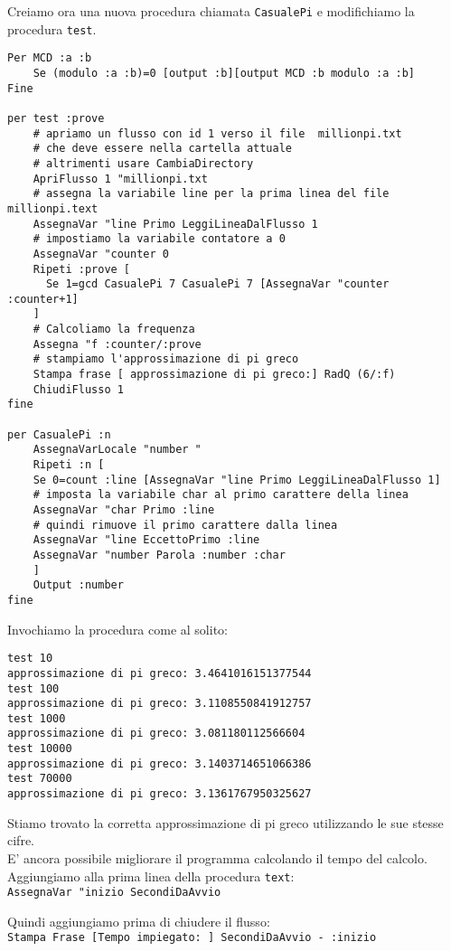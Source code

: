 Creiamo ora una nuova procedura chiamata \texttt{CasualePi} e modifichiamo la procedura \texttt{test}.
\begin{lstlisting}
Per MCD :a :b
	Se (modulo :a :b)=0 [output :b][output MCD :b modulo :a :b] 
Fine

per test :prove
	# apriamo un flusso con id 1 verso il file  millionpi.txt
	# che deve essere nella cartella attuale
	# altrimenti usare CambiaDirectory
	ApriFlusso 1 "millionpi.txt
	# assegna la variabile line per la prima linea del file millionpi.text
	AssegnaVar "line Primo LeggiLineaDalFlusso 1
	# impostiamo la variabile contatore a 0
	AssegnaVar "counter 0
	Ripeti :prove [
	  Se 1=gcd CasualePi 7 CasualePi 7 [AssegnaVar "counter :counter+1]
	]
	# Calcoliamo la frequenza
	Assegna "f :counter/:prove
	# stampiamo l'approssimazione di pi greco
	Stampa frase [ approssimazione di pi greco:] RadQ (6/:f)
	ChiudiFlusso 1
fine

per CasualePi :n
	AssegnaVarLocale "number "
	Ripeti :n [
	Se 0=count :line [AssegnaVar "line Primo LeggiLineaDalFlusso 1]
	# imposta la variabile char al primo carattere della linea
	AssegnaVar "char Primo :line
	# quindi rimuove il primo carattere dalla linea
	AssegnaVar "line EccettoPrimo :line
	AssegnaVar "number Parola :number :char
	]
	Output :number
fine
\end{lstlisting}

Invochiamo la procedura come al solito:
\begin{verbatim}
test 10
approssimazione di pi greco: 3.4641016151377544 
test 100
approssimazione di pi greco: 3.1108550841912757 
test 1000
approssimazione di pi greco: 3.081180112566604 
test 10000
approssimazione di pi greco: 3.1403714651066386 
test 70000
approssimazione di pi greco: 3.1361767950325627
\end{verbatim}

Stiamo trovato la corretta approssimazione di pi greco utilizzando le sue stesse cifre.\\
E' ancora possibile migliorare il programma calcolando il tempo del calcolo. Aggiungiamo alla prima linea della procedura \texttt{text}:\\
\texttt{AssegnaVar "inizio SecondiDaAvvio}

Quindi aggiungiamo prima di chiudere il flusso:\\
\texttt{Stampa Frase [Tempo impiegato: ] SecondiDaAvvio - :inizio}
